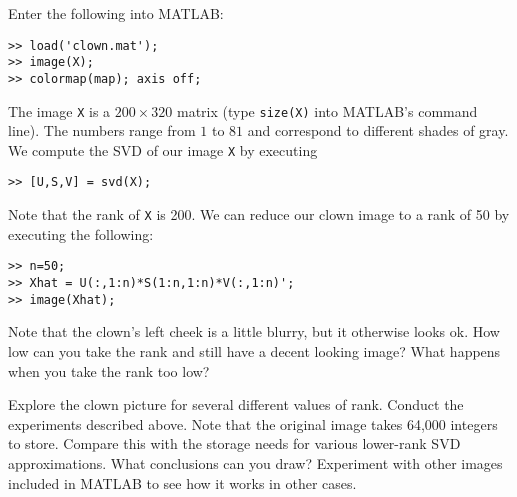 \begin{matlab}
 Enter the following into MATLAB:
\begin{lstlisting}[style=matlab]
>> load('clown.mat');
>> image(X);
>> colormap(map); axis off;
\end{lstlisting}
The image {\tt X} is a $200\times 320$ matrix (type {\tt size(X)}
into MATLAB's command line).  The numbers range from $1$ to $81$ and
correspond to different shades of gray.  We compute the SVD of our
image {\tt X} by executing
\begin{lstlisting}[style=matlab]
>> [U,S,V] = svd(X);
\end{lstlisting}
Note that the rank of {\tt X} is 200.  We can reduce our clown image
to a rank of 50 by executing the following:
\begin{lstlisting}[style=matlab]
>> n=50;
>> Xhat = U(:,1:n)*S(1:n,1:n)*V(:,1:n)';
>> image(Xhat);
\end{lstlisting}
Note that the clown's left cheek is a little blurry, but it
otherwise looks ok.  How low can you take the rank and still have a
decent looking image?  What happens when you take the rank too low?

\begin{problem}
Explore the clown picture for several different values of rank.
Conduct the experiments described above.  Note that the original
image takes 64,000 integers to store.  Compare this with the storage
needs for various lower-rank SVD approximations. What conclusions
can you draw? Experiment with other images included in MATLAB to see how it works in other cases.
\end{problem}
\end{matlab}
